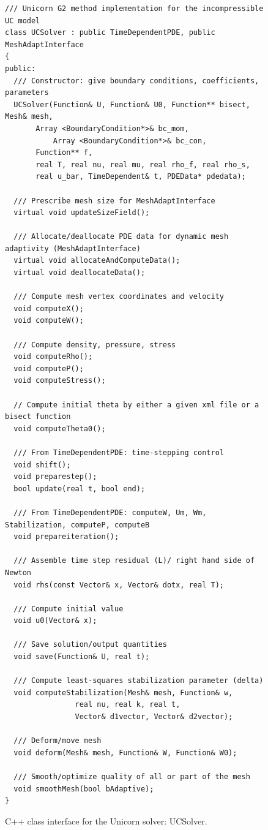 \begin{figure}[!h]
\begin{lstlisting}
/// Unicorn G2 method implementation for the incompressible UC model 
class UCSolver : public TimeDependentPDE, public MeshAdaptInterface
{
public:
  /// Constructor: give boundary conditions, coefficients, parameters
  UCSolver(Function& U, Function& U0, Function** bisect, Mesh& mesh,
	   Array <BoundaryCondition*>& bc_mom,
           Array <BoundaryCondition*>& bc_con,
	   Function** f,
	   real T, real nu, real mu, real rho_f, real rho_s,
	   real u_bar, TimeDependent& t, PDEData* pdedata); 

  /// Prescribe mesh size for MeshAdaptInterface
  virtual void updateSizeField();

  /// Allocate/deallocate PDE data for dynamic mesh adaptivity (MeshAdaptInterface)
  virtual void allocateAndComputeData();
  virtual void deallocateData();

  /// Compute mesh vertex coordinates and velocity
  void computeX();
  void computeW();

  /// Compute density, pressure, stress
  void computeRho();
  void computeP();
  void computeStress();

  // Compute initial theta by either a given xml file or a bisect function
  void computeTheta0();

  /// From TimeDependentPDE: time-stepping control
  void shift();
  void preparestep();
  bool update(real t, bool end);

  /// From TimeDependentPDE: computeW, Um, Wm, Stabilization, computeP, computeB
  void prepareiteration();

  /// Assemble time step residual (L)/ right hand side of Newton
  void rhs(const Vector& x, Vector& dotx, real T);

  /// Compute initial value
  void u0(Vector& x);

  /// Save solution/output quantities
  void save(Function& U, real t);

  /// Compute least-squares stabilization parameter (delta)
  void computeStabilization(Mesh& mesh, Function& w,
			    real nu, real k, real t,
			    Vector& d1vector, Vector& d2vector);

  /// Deform/move mesh
  void deform(Mesh& mesh, Function& W, Function& W0);

  /// Smooth/optimize quality of all or part of the mesh
  void smoothMesh(bool bAdaptive);
}

\end{lstlisting}
\caption{
C++ class interface for the Unicorn solver: UCSolver.
}
\label{code:UCSolver}
\end{figure}



